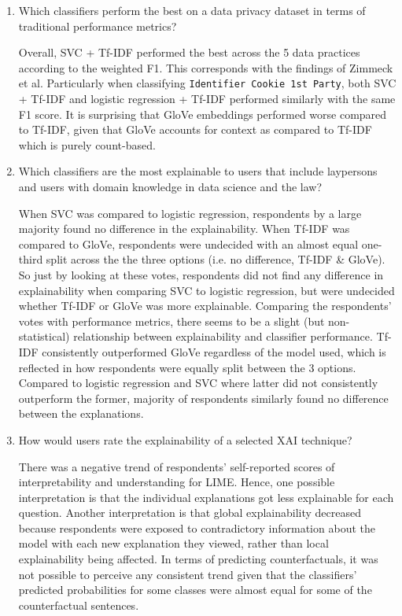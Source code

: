 \begin{enumerate}
    \item Which classifiers perform the best on a data privacy dataset in terms of traditional performance metrics?
    
    Overall, SVC + Tf-IDF performed the best across the 5 data practices according to the weighted F1. This corresponds with the findings of Zimmeck et al. Particularly when classifying \texttt{Identifier Cookie 1st Party}, both SVC + Tf-IDF and logistic regression + Tf-IDF performed similarly with the same F1 score. It is surprising that GloVe embeddings performed worse compared to Tf-IDF, given that GloVe accounts for context as compared to Tf-IDF which is purely count-based.

    \item Which classifiers are the most explainable to users that include laypersons and users with domain knowledge in data science and the law?
    
    When SVC was compared to logistic regression, respondents by a large majority found no difference in the explainability. When Tf-IDF was compared to GloVe, respondents were undecided with an almost equal one-third split across the the three options (i.e. no difference, Tf-IDF \& GloVe). So just by looking at these votes, respondents did not find any difference in explainability when comparing SVC to logistic regression, but were undecided whether Tf-IDF or GloVe was more explainable. Comparing the respondents' votes with performance metrics, there seems to be a slight (but non-statistical) relationship between explainability and classifier performance. Tf-IDF consistently outperformed GloVe regardless of the model used, which is reflected in how respondents were equally split between the 3 options. Compared to logistic regression and SVC where latter did not consistently outperform the former, majority of respondents similarly found no difference between the explanations. 

    \item How would users rate the explainability of a selected XAI technique?
    
    There was a negative trend of respondents' self-reported scores of interpretability and understanding for LIME. Hence, one possible interpretation is that the individual explanations got less explainable for each question. Another interpretation is that global explainability decreased because respondents were exposed to contradictory information about the model with each new explanation they viewed, rather than local explainability being affected. In terms of predicting counterfactuals, it was not possible to perceive any consistent trend given that the classifiers' predicted probabilities for some classes were almost equal for some of the counterfactual sentences. 


\end{enumerate}
